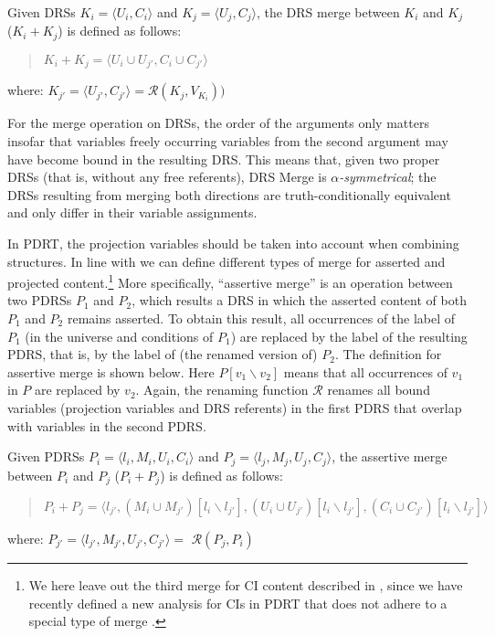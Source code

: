 \begin{definition}\label{def:DRSmerge}
Given DRSs $K_i=\langle U_i,C_i \rangle$ and $K_j=\langle U_j,C_j \rangle$,
the DRS merge between $K_i$ and $K_j$ ($K_i + K_j$) is defined as follows:
  \begin{quote}
    $K_i + K_j = 
    \langle U_i\cup U_{j'},C_i \cup C_{j'}\rangle$
  \end{quote}
  where: $K_{j'} = \langle U_{j'},C_{j'} \rangle = \mathcal{R}(K_j,V_{K_i}))$
\end{definition}

\noindent For the merge operation on DRSs, the order of the arguments only
matters insofar that variables freely occurring variables from the second
argument may have become bound in the resulting DRS. This means that, given
two proper DRSs (that is, without any free referents), DRS Merge is
\textit{$\alpha$-symmetrical}; the DRSs resulting from merging both
directions are truth-conditionally equivalent and only differ in their
variable assignments.

In PDRT, the projection variables should be taken into account when
combining structures.  In line with  we can
define different types of merge for asserted and projected
content.\footnote{We here leave out the third merge for CI content described
in , since we have recently defined a new
analysis for CIs in PDRT that does not adhere to a special type of merge
\cite{venhuizen2014salt}.} More specifically, ``assertive merge'' is an
operation between two PDRSs $P_1$ and $P_2$, which results a DRS in which
the asserted content of both $P_1$ and $P_2$ remains asserted. To obtain
this result, all occurrences of the label of $P_1$ (in the universe and
conditions of $P_1$) are replaced by the label of the resulting PDRS, that
is, by the label of (the renamed version of) $P_2$. The definition for
assertive merge is shown below. Here $P[v_1\backslash v_2]$ means that all
occurrences of $v_1$ in $P$ are replaced by $v_2$. Again, the renaming
function $\mathcal{R}$ renames all bound variables (projection variables and
DRS referents) in the first PDRS that overlap with variables in the second
PDRS.

\begin{definition}\label{def:amerge}
Given PDRSs $P_i=\langle l_i,M_i,U_i,C_i \rangle$ and
$P_j=\langle l_j,M_j,U_j,C_j \rangle$, the assertive merge between $P_i$
and $P_j$ ($P_i + P_j$) is defined as follows:
  \begin{quote}
    $P_i + P_j = 
      \langle l_{j'}, 
      (M_{i}\cup M_{j'})[l_i\backslash l_{j'}],
      (U_{i}\cup U_{j'})[l_i\backslash l_{j'}],
      (C_{i}\cup C_{j'})[l_i\backslash l_{j'}]
      \rangle$
  \end{quote}
  where: $P_{j'} = \langle l_{j'}, M_{j'}, U_{j'}, C_{j'} \rangle =$
      $\mathcal{R}(P_j,P_i)$
\end{definition}

